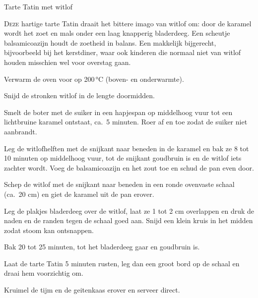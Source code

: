 \begin{recipe}{Tarte Tatin met witlof}


\lettrine{D}{eze} hartige tarte Tatin draait het bittere imago van witlof om: door de
karamel wordt het zoet en mals onder een laag knapperig bladerdeeg. Een scheutje
balsamicoazijn houdt de zoetheid in balans. Een makkelijk bijgerecht, bijvoorbeeld
bij het kerstdiner, waar ook kinderen die normaal niet van witlof houden misschien
wel voor overstag gaan.

\begin{ingredients}
\end{ingredients}

\begin{steps}
  \item Verwarm de oven voor op 200\,°C (boven- en onderwarmte).
  \item Snijd de stronken witlof in de lengte doormidden.
  \item Smelt de boter met de suiker in een hapjespan op middelhoog vuur tot een
        lichtbruine karamel ontstaat, ca.\ 5 minuten. Roer af en toe zodat de suiker
        niet aanbrandt.
  \item Leg de witlofhelften met de snijkant naar beneden in de karamel en bak ze
        8 tot 10 minuten op middelhoog vuur, tot de snijkant goudbruin is en de
        witlof iets zachter wordt. Voeg de balsamicoazijn en het zout toe en schud
        de pan even door.
  \item Schep de witlof met de snijkant naar beneden in een ronde ovenvaste schaal
        (ca.\ 20 cm) en giet de karamel uit de pan erover.
  \item Leg de plakjes bladerdeeg over de witlof, laat ze 1 tot 2 cm overlappen en
        druk de naden en de randen tegen de schaal goed aan. Snijd een klein kruis
        in het midden zodat stoom kan ontsnappen.
  \item Bak 20 tot 25 minuten, tot het bladerdeeg gaar en goudbruin is.
  \item Laat de tarte Tatin 5 minuten rusten, leg dan een groot bord op de schaal
        en draai hem voorzichtig om.
  \item Kruimel de tijm en de geitenkaas erover en serveer direct.
\end{steps}

\end{recipe}
